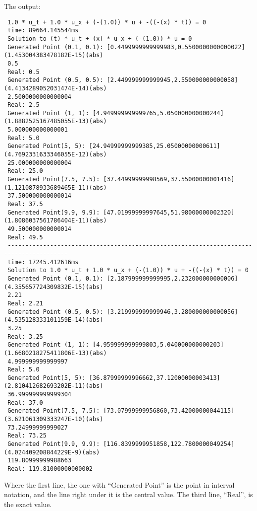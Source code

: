 \noindent The output:
\begingroup
\fontsize{10pt}{12pt}
\begin{verbatim}
 1.0 * u_t + 1.0 * u_x + (-(1.0)) * u + -((-(x) * t)) = 0
 time: 89664.145544ms
 Solution to (t) * u_t + (x) * u_x + (-(1.0)) * u = 0
 Generated Point (0.1, 0.1): [0.4499999999999983,0.5500000000000022]  (1.453004383478182E-15)(abs)
 0.5
 Real: 0.5
 Generated Point (0.5, 0.5): [2.449999999999945,2.550000000000058]  (4.4134289052031474E-14)(abs)
 2.5000000000000004
 Real: 2.5
 Generated Point (1, 1): [4.949999999999765,5.050000000000244]  (1.8882525167485055E-13)(abs)
 5.000000000000001
 Real: 5.0
 Generated Point(5, 5): [24.94999999999385,25.05000000000611]  (4.7692331633346055E-12)(abs)
 25.000000000000004
 Real: 25.0
 Generated Point(7.5, 7.5): [37.44999999998569,37.55000000001416]  (1.1210878933689465E-11)(abs)
 37.500000000000014
 Real: 37.5
 Generated Point(9.9, 9.9): [47.01999999997645,51.98000000002320]  (1.8086037561786404E-11)(abs)
 49.500000000000014
 Real: 49.5
 ---------------------------------------------------------------------------------------
 time: 17245.412616ms
 Solution to 1.0 * u_t + 1.0 * u_x + (-(1.0)) * u + -((-(x) * t)) = 0
 Generated Point (0.1, 0.1): [2.187999999999995,2.232000000000006]  (4.355657724309832E-15)(abs)
 2.21
 Real: 2.21
 Generated Point (0.5, 0.5): [3.219999999999946,3.280000000000056]  (4.535128333101159E-14)(abs)
 3.25
 Real: 3.25
 Generated Point (1, 1): [4.959999999999803,5.040000000000203]  (1.6680218275411806E-13)(abs)
 4.999999999999997
 Real: 5.0
 Generated Point(5, 5): [36.87999999996662,37.12000000003413]  (2.810412682693202E-11)(abs)
 36.999999999999304
 Real: 37.0
 Generated Point(7.5, 7.5): [73.07999999956860,73.42000000044115]  (3.621061309333247E-10)(abs)
 73.24999999999027
 Real: 73.25
 Generated Point(9.9, 9.9): [116.8399999951858,122.7800000049254]  (4.024409208844229E-9)(abs)
 119.80999999988663
 Real: 119.81000000000002
\end{verbatim}
\endgroup
Where the first line, the one with ``Generated Point'' is the point in
interval notation, and the line right under it is the central
value. The third line, ``Real'', is the exact value.
